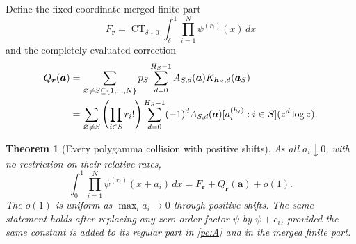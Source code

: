 \documentclass[11pt,a4paper]{article}
\newtheorem{theorem}{Theorem}[section]
\theoremstyle{definition}
\theoremstyle{remark}
\numberwithin{equation}{section}
\begin{document}
Define the fixed-coordinate merged finite part
\begin{equation}\label{pc:merged}
 F_{\boldsymbol r}
    =\operatorname{CT}_{\delta\downarrow0}
                  \int_\delta^1\prod_{i=1}^N\psi^{(r_i)}(x)\,dx
\end{equation}
and the completely evaluated correction
\begin{align}\label{pc:Q}
 Q_{\boldsymbol r}(\boldsymbol a)
   &=\sum_{\varnothing\ne S\subseteq\{1,\ldots,N\}}
        p_S\sum_{d=0}^{H_S-1}A_{S,d}(\boldsymbol a)
                        K_{\boldsymbol h_S,d}(\boldsymbol a_S)\notag\\
   &=\sum_{\varnothing\ne S}
       \left(\prod_{i\in S}r_i!\right)
       \sum_{d=0}^{H_S-1}(-1)^d A_{S,d}(\boldsymbol a)
        [a_i^{(h_i)}:i\in S](z^d\log z).
\end{align}

\begin{theorem}[Every polygamma collision with positive shifts]
\label{pc:uniform}
As all $a_i\downarrow0$, with no restriction on their relative rates,
\begin{equation}\label{pc:uniform-formula}
 \boxed{\displaystyle
 \int_0^1\prod_{i=1}^N\psi^{(r_i)}(x+a_i)\,dx
          =F_{\boldsymbol r}+Q_{\boldsymbol r}(\boldsymbol a)+o(1).}
\end{equation}
The $o(1)$ is uniform as $\max_i a_i\to0$ through positive shifts.
The same statement holds after replacing any zero-order factor
$\psi$ by $\psi+c_i$, provided the same constant is added to its
regular part in \eqref{pc:A} and in the merged finite part.
\end{theorem}
\end{document}
